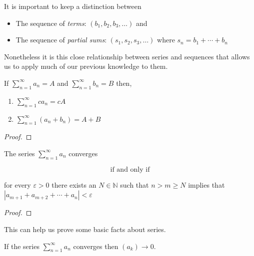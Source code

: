		
		\begin{dangerousbend}
			It is important to keep a distinction between 
				\begin{itemize}
					\item The sequence of \emph{terms}: $(b_1, b_2, b_3, \ldots)$ and
					\item The sequence of \emph{partial sums}:  $(s_1, s_2, s_3, \ldots)$ where $s_n = b_1 +  \cdots + b_n$
				\end{itemize}
		\end{dangerousbend}
		
		Nonetheless it is this close relationship between series and sequences that allows us to apply much of our previous knowledge to them.
		
		
		\begin{theorem}
		If $\sum_{n=1}^{\infty} a_n = A$ and $\sum_{n=1}^{\infty} b_n = B$ then,
			\begin{enumerate}[(1)]
				\item $\sum_{n=1}^{\infty} c a_n = cA$
				\item $\sum_{n=1}^{\infty} (a_n + b_n) = A + B$
			\end{enumerate}
		\end{theorem}
		
		\begin{proof}
		\end{proof}
		
		\begin{theorem} 
		The series $\sum_{n=1}^{\infty} a_n$ converges 
		
		\[\text{if and only if}\]
		
		
		 for every $\varepsilon > 0$ there exists an $N \in \mathbb{N}$ such that $n>m\geq N$ implies that $|a_{m+1} + a_{m+2} + \cdots + a_n| < \varepsilon$
		\end{theorem}
		
		
	\begin{proof}  \end{proof}
	
	This can help us prove some basic facts about series.
	
	
	\begin{theorem} If the series $\sum_{n=1}^{\infty} a_n$ converges then $(a_k) \to 0$.  
	\end{theorem}
	
